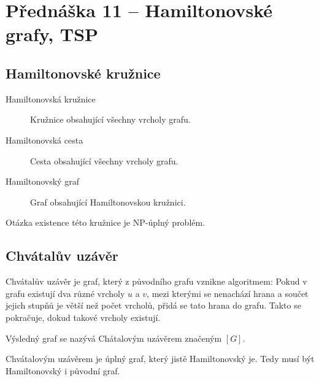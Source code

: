 \section{Přednáška 11 -- Hamiltonovské grafy, TSP}

\subsection{Hamiltonovské kružnice}

\begin{description}
    \item[Hamiltonovská kružnice] Kružnice obsahující všechny vrcholy grafu.
    \item[Hamiltonovská cesta] Cesta obsahující všechny vrcholy grafu.
    \item[Hamiltonovský graf] Graf obsahující Hamiltonovskou kružnici.
\end{description}

Otázka existence této kružnice je NP-úplný problém.

\subsection{Chvátalův uzávěr}\label{alg:chvataluv-uzaver}

\label{lemma:chvatalova-veta}

Chvátalův uzávěr je graf, který z původního grafu vznikne algoritmem:
Pokud v grafu existují dva různé vrcholy $u$ a $v$, mezi kterými se nenachází hrana a součet jejich stupňů je větší než počet vrcholů, přidá se tato hrana do grafu.
Takto se pokračuje, dokud takové vrcholy existují.

Výsledný graf se nazývá Chátalovým uzávěrem značeným $[G]$.



Chvátalovým uzávěrem je úplný graf, který jistě Hamiltonovský je.
Tedy musí být Hamiltonovský i původní graf.

\label{lemma:dicarova-veta}

